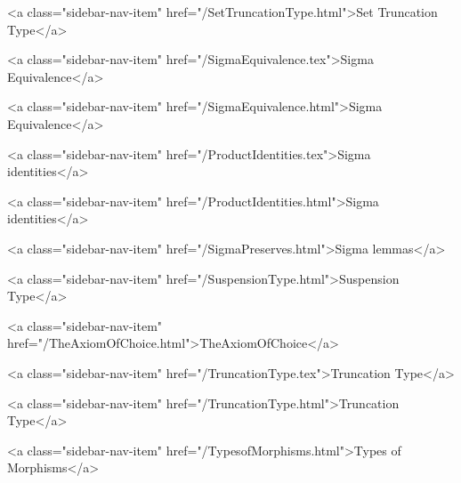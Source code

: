      
    
      
        
          <a class="sidebar-nav-item" href="/SetTruncationType.html">Set Truncation Type</a>
        
      
    
      
        
          <a class="sidebar-nav-item" href="/SigmaEquivalence.tex">Sigma Equivalence</a>
        
      
    
      
        
          <a class="sidebar-nav-item" href="/SigmaEquivalence.html">Sigma Equivalence</a>
        
      
    
      
        
          <a class="sidebar-nav-item" href="/ProductIdentities.tex">Sigma identities</a>
        
      
    
      
        
          <a class="sidebar-nav-item" href="/ProductIdentities.html">Sigma identities</a>
        
      
    
      
        
          <a class="sidebar-nav-item" href="/SigmaPreserves.html">Sigma lemmas</a>
        
      
    
      
        
          <a class="sidebar-nav-item" href="/SuspensionType.html">Suspension Type</a>
        
      
    
      
        
          <a class="sidebar-nav-item" href="/TheAxiomOfChoice.html">TheAxiomOfChoice</a>
        
      
    
      
        
          <a class="sidebar-nav-item" href="/TruncationType.tex">Truncation Type</a>
        
      
    
      
        
          <a class="sidebar-nav-item" href="/TruncationType.html">Truncation Type</a>
        
      
    
      
        
          <a class="sidebar-nav-item" href="/TypesofMorphisms.html">Types of Morphisms</a>
        
